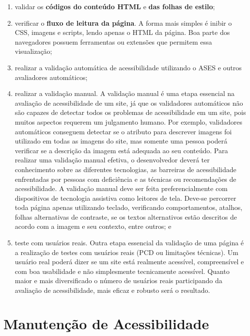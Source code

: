 \documentclass[
  12pt,
  openright,
  twoside,
  a4paper,
  english,
  french,
  spanish,
  brazil
]{abntex2}
\begin{document}
\begin{enumerate}
  \item
    validar os \textbf{códigos do conteúdo HTML} e \textbf{das folhas de
    estilo};
  \item
    verificar o \textbf{fluxo de leitura da página}. A forma mais simples é
    inibir o CSS, imagens e scripts, lendo apenas o HTML da página. Boa parte
    dos navegadores possuem ferramentas ou extensões que permitem essa
    visualização;
  \item
    realizar a validação automática de acessibilidade utilizando o ASES e outros
    avaliadores automáticos;
  \item
    realizar a validação manual. A validação manual é uma etapa essencial na
    avaliação de acessibilidade de um site, já que os validadores automáticos
    não são capazes de detectar todos os problemas de acessibilidade em um site,
    pois muitos aspectos requerem um julgamento humano. Por exemplo, validadores
    automáticos conseguem detectar se o atributo para descrever imagens foi
    utilizado em todas as imagens do site, mas somente uma pessoa poderá
    verificar se a descrição da imagem está adequada ao seu conteúdo. Para
    realizar uma validação manual efetiva, o desenvolvedor deverá ter
    conhecimento sobre as diferentes tecnologias, as barreiras de acessibilidade
    enfrentadas por pessoas com deficiência e as técnicas ou recomendações de
    acessibilidade. A validação manual deve ser feita preferencialmente com
    dispositivos de tecnologia assistiva como leitores de tela. Deve-se
    percorrer toda página apenas utilizando teclado, verificando comportamentos,
    atalhos, folhas alternativas de contraste, se os textos alternativos estão
    descritos de acordo com a imagem e seu contexto, entre outros; e
  \item
    teste com usuários reais. Outra etapa essencial da validação de uma página é
    a realização de testes com usuários reais (PCD ou limitações técnicas). Um
    usuário real poderá dizer se um site está realmente acessível, compreensível
    e com boa usabilidade e não simplesmente tecnicamente acessível. Quanto
    maior e mais diversificado o número de usuários reais participando da
    avaliação de acessibilidade, mais eficaz e robusto será o resultado.
\end{enumerate}

\section{Manutenção de Acessibilidade}
\end{document}
